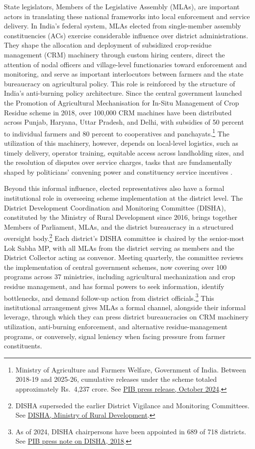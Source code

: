 \documentclass[12pt]{article}
\begin{document}
State legislators, Members of the Legislative Assembly (MLAs), are important actors in translating these national frameworks into local enforcement and service delivery. In India's federal system, MLAs elected from single-member assembly constituencies (ACs) exercise considerable influence over district administrations. They shape the allocation and deployment of subsidized crop-residue management (CRM) machinery through custom hiring centers, direct the attention of nodal officers and village-level functionaries toward enforcement and monitoring, and serve as important interlocutors between farmers and the state bureaucracy on agricultural policy. This role is reinforced by the structure of India's anti-burning policy architecture. Since the central government launched the Promotion of Agricultural Mechanisation for In-Situ Management of Crop Residue scheme in 2018, over 100,000 CRM machines have been distributed across Punjab, Haryana, Uttar Pradesh, and Delhi, with subsidies of 50 percent to individual farmers and 80 percent to cooperatives and panchayats.\footnote{Ministry of Agriculture and Farmers Welfare, Government of India. Between 2018-19 and 2025-26, cumulative releases under the scheme totaled approximately Rs.~4,237 crore. See \href{https://pib.gov.in/PressReleasePage.aspx?PRID=2068477}{PIB press release, October 2024}.} The utilization of this machinery, however, depends on local-level logistics, such as timely delivery, operator training, equitable access across landholding sizes, and the resolution of disputes over service charges, tasks that are fundamentally shaped by politicians' convening power and constituency service incentives \citep{jack2022money, shyamsundar2019fields}.

Beyond this informal influence, elected representatives also have a formal institutional role in overseeing scheme implementation at the district level. The District Development Coordination and Monitoring Committee (DISHA), constituted by the Ministry of Rural Development since 2016, brings together Members of Parliament, MLAs, and the district bureaucracy in a structured oversight body.\footnote{DISHA superseded the earlier District Vigilance and Monitoring Committees. See \href{https://disha.gov.in/disha/}{DISHA, Ministry of Rural Development}.} Each district's DISHA committee is chaired by the senior-most Lok Sabha MP, with all MLAs from the district serving as members and the District Collector acting as convenor. Meeting quarterly, the committee reviews the implementation of central government schemes, now covering over 100 programs across 37 ministries, including agricultural mechanization and crop residue management, and has formal powers to seek information, identify bottlenecks, and demand follow-up action from district officials.\footnote{As of 2024, DISHA chairpersons have been appointed in 689 of 718 districts. See \href{https://www.pib.gov.in/PressNoteDetails.aspx?NoteId=150545&ModuleId=3}{PIB press note on DISHA, 2018}.} This institutional arrangement gives MLAs a formal channel, alongside their informal leverage, through which they can press district bureaucracies on CRM machinery utilization, anti-burning enforcement, and alternative residue-management programs, or conversely, signal leniency when facing pressure from farmer constituents.
\end{document}
